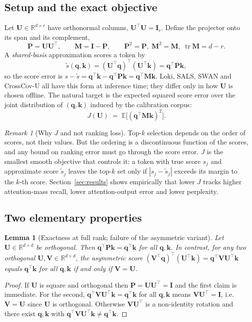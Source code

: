 \documentclass[10pt]{article}
\newcommand{\R}{\mathbb{R}}
\newcommand{\E}{\mathbb{E}}
\newcommand{\tr}{\operatorname{tr}}
\newcommand{\bq}{\mathbf{q}}
\newcommand{\bk}{\mathbf{k}}
\newcommand{\bV}{\mathbf{V}}
\newcommand{\bU}{\mathbf{U}}
\newcommand{\bM}{\mathbf{M}}
\newcommand{\bP}{\mathbf{P}}
\newcommand{\bI}{\mathbf{I}}
\newcommand{\method}{CrossCov-U}
\theoremstyle{plain}
\newtheorem{lemma}[theorem]{Lemma}
\theoremstyle{definition}
\theoremstyle{remark}
\newtheorem{remark}[theorem]{Remark}
\begin{document}
\subsection{Setup and the exact objective}
\label{sec:setup}

Let $\bU\in\R^{d\times r}$ have orthonormal columns, $\bU^\top\bU=\bI_r$.
Define the projector onto its span and its complement,
\begin{equation}
  \bP=\bU\bU^\top,\qquad \bM=\bI-\bP,\qquad \bP^2=\bP,\;\bM^2=\bM,\;\tr\bM=d-r.
\end{equation}
A \emph{shared-basis} approximation scores a token by
\begin{equation}
  \label{eq:latent}
  \tilde s(\bq,\bk) = (\bU^\top\bq)^\top(\bU^\top\bk) = \bq^\top\bP\bk,
\end{equation}
so the score error is $s-\tilde s = \bq^\top\bk-\bq^\top\bP\bk = \bq^\top\bM\bk$.
Loki, SALS, SWAN and \method{} all have this form at inference time; they
differ only in how $\bU$ is chosen offline. The natural target is the
expected squared score error over the joint distribution of $(\bq,\bk)$
induced by the calibration corpus:
\begin{equation}
  \label{eq:J}
  J(\bU) \;=\; \E\big[(\bq^\top\bM\bk)^2\big].
\end{equation}

\begin{remark}[Why $J$ and not ranking loss]
Top-$k$ selection depends on the order of scores, not their values. But the
ordering is a discontinuous function of the scores, and any bound on ranking
error must go through the score error. $J$ is the smallest smooth objective
that controls it: a token with true score $s_j$ and approximate score
$\tilde s_j$ leaves the top-$k$ set only if $|s_j-\tilde s_j|$ exceeds its
margin to the $k$-th score. Section~\ref{sec:results} shows empirically that
lower $J$ tracks higher attention-mass recall, lower attention-output error
and lower perplexity.
\end{remark}

\subsection{Two elementary properties}

\begin{lemma}[Exactness at full rank; failure of the asymmetric variant]
\label{lem:exact}
Let $\bU\in\R^{d\times d}$ be orthogonal. Then $\bq^\top\bP\bk=\bq^\top\bk$
for all $\bq,\bk$. In contrast, for any two orthogonal
$\bU,\bV\in\R^{d\times d}$, the asymmetric score
$(\bV^\top\bq)^\top(\bU^\top\bk)=\bq^\top\bV\bU^\top\bk$ equals
$\bq^\top\bk$ for all $\bq,\bk$ if and only if $\bV=\bU$.
\end{lemma}
\begin{proof}
If $\bU$ is square and orthogonal then $\bP=\bU\bU^\top=\bI$ and the first
claim is immediate. For the second, $\bq^\top\bV\bU^\top\bk=\bq^\top\bk$ for
all $\bq,\bk$ means $\bV\bU^\top=\bI$, i.e.\ $\bV=\bU$ since $\bU$ is
orthogonal. Otherwise $\bV\bU^\top$ is a non-identity rotation and there
exist $\bq,\bk$ with $\bq^\top\bV\bU^\top\bk\neq\bq^\top\bk$.
\end{proof}
\end{document}
